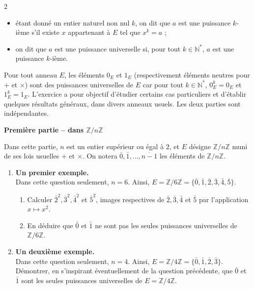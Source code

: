 \documentclass{article}
\begin{document}
\begin{paracol}{2}
{\begin{itemize}
    \item étant donné un entier naturel non nul $k$, on dit que $a$ est une puissance $k$-ième s'il existe $x$ appartenant à $E$ tel que $x^k = a$ ;
    \item on dit que $a$ est une puissance universelle si, pour tout $k \in \mathbb{N}^*$, $a$ est une puissance $k$-ième.
\end{itemize}
Pour tout anneau $E$, les éléments $0_E$ et $1_E$ (respectivement éléments neutres pour $+$ et $\times$) sont des puissances universelles de $E$ car pour tout $k \in \mathbb{N}^*$, $0_E^k = 0_E$ et $1_E^k = 1_E$.
L'exercice a pour objectif d'étudier certains cas particuliers et d'établir quelques résultats généraux, dans divers anneaux usuels. Les deux parties sont indépendantes.

\textbf{Première partie – dans $\mathbb{Z}/n\mathbb{Z}$}

Dans cette partie, $n$ est un entier supérieur ou égal à $2$, et $E$ désigne $\mathbb{Z}/n\mathbb{Z}$ muni de ses lois usuelles $+$ et $\times$. On notera $\bar{0}, \bar{1}, \dots, \overline{n-1}$ les éléments de $\mathbb{Z}/n\mathbb{Z}$.

\begin{enumerate}
    \item \textbf{Un premier exemple.} \\
    Dans cette question seulement, $n = 6$. Ainsi, $E = \mathbb{Z}/6\mathbb{Z} = \{\bar{0}, \bar{1}, \bar{2}, \bar{3}, \bar{4}, \bar{5}\}$.
    \begin{enumerate}
        \item Calculer $\bar{2}^2, \bar{3}^2, \bar{4}^2$ et $\bar{5}^2$, images respectives de $\bar{2}, \bar{3}, \bar{4}$ et $\bar{5}$ par l'application $x \mapsto x^2$.
        \item En déduire que $\bar{0}$ et $\bar{1}$ ne sont pas les seules puissances universelles de $\mathbb{Z}/6\mathbb{Z}$.
    \end{enumerate}

    \item \textbf{Un deuxième exemple.} \\
    Dans cette question seulement, $n = 4$. Ainsi, $E = \mathbb{Z}/4\mathbb{Z} = \{\bar{0}, \bar{1}, \bar{2}, \bar{3}\}$. \\
    Démontrer, en s'inspirant éventuellement de la question précédente, que $\bar{0}$ et $\bar{1}$ sont les seules puissances universelles de $E = \mathbb{Z}/4\mathbb{Z}$.
    

\end{enumerate}}
\end{paracol}
\end{document}
